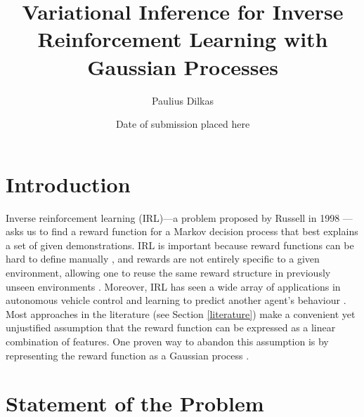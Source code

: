 \documentclass{mprop}
\theoremstyle{definition}
\begin{document}
\title{Variational Inference for Inverse Reinforcement Learning with Gaussian
  Processes}
\author{Paulius Dilkas}
\date{Date of submission placed here} %
\maketitle
\tableofcontents
\newpage

\newcommand{\Kuu}{\mathbf{K}_{\mathbf{u},\mathbf{u}}}
\newcommand{\Krr}{\mathbf{K}_{\mathbf{r},\mathbf{r}}}
\newcommand{\Kru}{\mathbf{K}_{\mathbf{r},\mathbf{u}}}
\newcommand{\DKL}{D_{\mathrm{KL}}}
\newcommand{\pfull}{p(\mathcal{D}, \Theta, \mathbf{X_u}, \mathbf{u}, \mathbf{r})}
\newcommand{\posterior}{p(\Theta, \mathbf{u}, \mathbf{r} | \mathcal{D}, \mathbf{X_u})}
\newcommand{\approximation}{q(\Theta, \mathbf{u}, \mathbf{r}; \Lambda)}

\section{Introduction}

Inverse reinforcement learning (IRL)---a problem proposed by Russell in 1998
\cite{DBLP:conf/colt/Russell98}---asks us to find a reward function for a Markov
decision process that best explains a set of given demonstrations. IRL is
important because reward functions can be hard to define manually
\cite{DBLP:conf/icml/PieterN04,DBLP:journals/corr/abs-1806-06877}, and rewards
are not entirely specific to a given environment, allowing one to reuse the same
reward structure in previously unseen environments
\cite{DBLP:journals/corr/abs-1806-06877,DBLP:conf/uai/JinDAS17,DBLP:conf/nips/LevinePK11}.
Moreover, IRL has seen a wide array of applications in autonomous vehicle
control
\cite{DBLP:journals/ijsr/KimP16,DBLP:journals/ijrr/KretzschmarSSB16}
and learning to predict another agent's behaviour
\cite{DBLP:journals/ai/BogertD18,DBLP:conf/aaai/VogelRGR12,ziebart2008maximum,DBLP:conf/huc/ZiebartMDB08,DBLP:conf/iros/ZiebartRGMPBHDS09}.
Most approaches in the literature (see Section \ref{literature}) make a
convenient yet unjustified assumption that the reward function can be expressed
as a linear combination of features. One proven way to abandon this assumption
is by representing the reward function as a Gaussian process
\cite{DBLP:conf/uai/JinDAS17,DBLP:conf/nips/LevinePK11,DBLP:journals/corr/abs-1208-2112}.

\section{Statement of the Problem}
\end{document}

